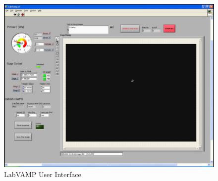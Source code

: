 \documentclass[a4paper,12pt]{article}
\begin{document}
\begin{figure}[htbp]
	\centering
		\includegraphics[width=1.00\textwidth]{figs/labvamp_ui.pdf}
	\caption{LabVAMP User Interface}
	\label{fig:labvampui}
\end{figure}
\end{document}
